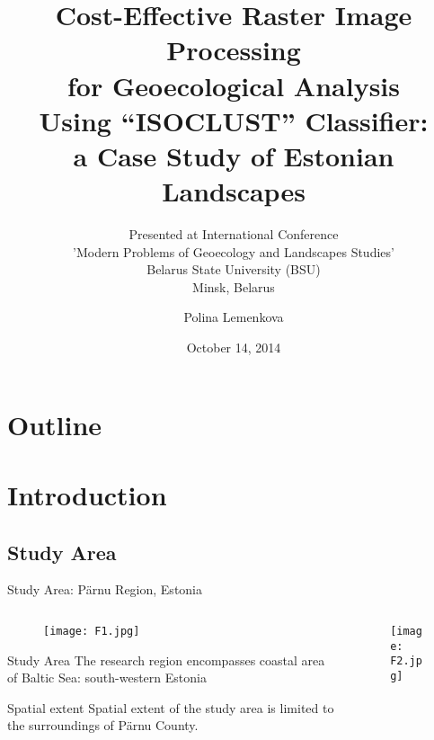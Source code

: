 \documentclass[pdflatex,compress,9pt,
	xcolor={dvipsnames,dvipsnames,svgnames,x11names,table},
	hyperref={colorlinks = true,breaklinks = true, urlcolor = NavyBlue, breaklinks = true}]{beamer}
\title{Cost-Effective Raster Image Processing\\
 for Geoecological Analysis \\
 Using “ISOCLUST” Classifier:\\
 a Case Study of Estonian Landscapes}\vspace{2em}
\subtitle{\vspace*{0.5cm}Presented at \nth{5} International Conference \\
'Modern Problems of Geoecology and Landscapes Studies'\\
Belarus State University (BSU)\\
Minsk, Belarus}
\author{Polina Lemenkova}
\date{October 14, 2014}
\begin{document}
\begin{frame}
           \titlepage
\end{frame}

\section*{Outline}
\begin{frame}
  \small{         \tableofcontents}
\end{frame}

\section{Introduction}

\subsection{Study Area}
\begin{frame}{Study Area: P\"{a}rnu Region, Estonia}
\begin{minipage}[0.4\textheight]{\textwidth}
\begin{columns}[T]
\begin{column}{0.5\textwidth}
\begin{figure}[H]
	\centering
		\texttt{[image: F1.jpg]}
\end{figure}
\begin{block}{Study Area}
The research region encompasses coastal area of Baltic Sea: south-western Estonia
\end{block}
 
\begin{alertblock}{Spatial extent}
Spatial extent of the study area is limited to the surroundings of P\"{a}rnu County.
\end{alertblock}

\end{column}
\begin{column}{0.5\textwidth}
\begin{figure}[H]
	\centering
		\texttt{[image: F2.jpg]}
\end{figure}
\end{column}
\end{columns}
\end{minipage}
\end{frame}
\end{document}

